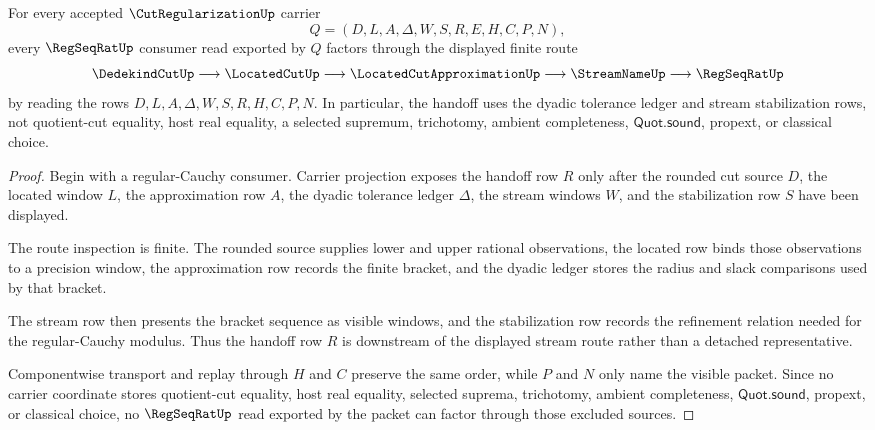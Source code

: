 \begin{theorem}
\label{thm:cut-regularization-window-to-regular-cauchy}
For every accepted $\CutRegularizationUp$ carrier
$$
Q=(D,L,A,\Delta,W,S,R,E,H,C,P,N),
$$
every $\RegSeqRatUp$ consumer read exported by $Q$ factors through the displayed finite route
$$
\DedekindCutUp \longrightarrow \LocatedCutUp \longrightarrow \LocatedCutApproximationUp \longrightarrow \StreamNameUp \longrightarrow \RegSeqRatUp
$$
by reading the rows $D,L,A,\Delta,W,S,R,H,C,P,N$. In particular, the handoff uses the dyadic tolerance ledger and stream stabilization rows, not quotient-cut equality, host real equality, a selected supremum, trichotomy, ambient completeness, $\mathsf{Quot.sound}$, propext, or classical choice.
\end{theorem}
\begin{proof}
Begin with a regular-Cauchy consumer. Carrier projection exposes the handoff row $R$ only after the rounded cut source $D$, the located window $L$, the approximation row $A$, the dyadic tolerance ledger $\Delta$, the stream windows $W$, and the stabilization row $S$ have been displayed.

The route inspection is finite. The rounded source supplies lower and upper rational observations, the located row binds those observations to a precision window, the approximation row records the finite bracket, and the dyadic ledger stores the radius and slack comparisons used by that bracket.

The stream row then presents the bracket sequence as visible windows, and the stabilization row records the refinement relation needed for the regular-Cauchy modulus. Thus the handoff row $R$ is downstream of the displayed stream route rather than a detached representative.

Componentwise transport and replay through $H$ and $C$ preserve the same order, while $P$ and $N$ only name the visible packet. Since no carrier coordinate stores quotient-cut equality, host real equality, selected suprema, trichotomy, ambient completeness, $\mathsf{Quot.sound}$, propext, or classical choice, no $\RegSeqRatUp$ read exported by the packet can factor through those excluded sources.
\end{proof}

